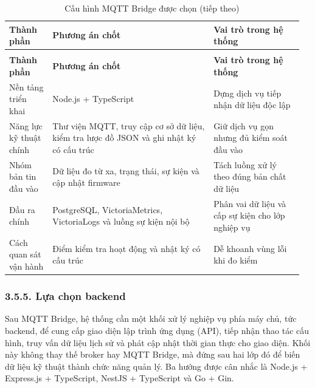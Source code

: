 \documentclass[a4paper]{extarticle}
\newcommand{\thesissettableid}[2]{%
  \renewcommand{\thetable}{#1}%
  \renewcommand{\theHtable}{#2}%
}
\begin{document}
{\thesissettableid{3.33}{condensed-bang-3-33-cau-hinh-mqtt-bridge-duoc-chon}
\def\LTcaptype{table}
\begin{longtable}{|L{0.14\linewidth}|L{0.524\linewidth}|L{0.295\linewidth}|}
\caption{Cấu hình MQTT Bridge được chọn}\label{tab:condensed-bang-3-33-cau-hinh-mqtt-bridge-duoc-chon}\\
\hline
\textbf{Thành phần} & \textbf{Phương án chốt} & \textbf{Vai trò trong hệ thống} \\
\hline
\endfirsthead
\caption[]{Cấu hình MQTT Bridge được chọn (tiếp theo)}\\
\hline
\textbf{Thành phần} & \textbf{Phương án chốt} & \textbf{Vai trò trong hệ thống} \\
\hline
\endhead
\endfoot
\endlastfoot
Nền tảng triển khai & Node.js + TypeScript & Dựng dịch vụ tiếp nhận dữ liệu độc lập \\\hline
Năng lực kỹ thuật chính & Thư viện MQTT, truy cập cơ sở dữ liệu, kiểm tra lược đồ JSON và ghi nhật ký có cấu trúc & Giữ dịch vụ gọn nhưng đủ kiểm soát đầu vào \\\hline
Nhóm bản tin đầu vào & Dữ liệu đo từ xa, trạng thái, sự kiện và cập nhật firmware & Tách luồng xử lý theo đúng bản chất dữ liệu \\\hline
Đầu ra chính & PostgreSQL, VictoriaMetrics, VictoriaLogs và luồng sự kiện nội bộ & Phân vai dữ liệu và cấp sự kiện cho lớp nghiệp vụ \\\hline
Cách quan sát vận hành & Điểm kiểm tra hoạt động và nhật ký có cấu trúc & Dễ khoanh vùng lỗi khi đo kiểm \\\hline
\end{longtable}
}

\subsubsection{3.5.5. Lựa chọn backend}\label{lux1ef1a-chux1ecdn-backend}

Sau MQTT Bridge, hệ thống cần một khối xử lý nghiệp vụ phía máy chủ, tức backend,
để cung cấp giao diện lập trình ứng dụng (API), tiếp nhận thao tác cấu hình, truy vấn dữ liệu lịch sử và phát
cập nhật thời gian thực cho giao diện. Khối này không thay thế broker hay MQTT
Bridge, mà đứng sau hai lớp đó để biến dữ liệu kỹ thuật thành chức năng quản lý.
Ba hướng được cân nhắc là Node.js + Express.js + TypeScript, NestJS +
TypeScript và Go + Gin.
\end{document}
